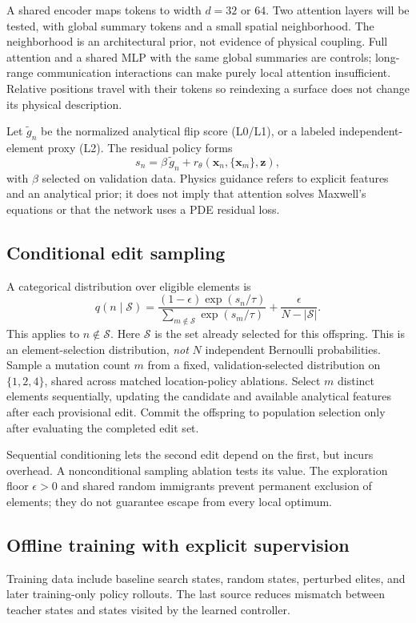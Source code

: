 \documentclass[conference]{IEEEtran}
\begin{document}
A shared encoder maps tokens to width $d=32$ or $64$. Two attention layers will be tested, with global summary tokens and a small spatial neighborhood. The neighborhood is an architectural prior, not evidence of physical coupling. Full attention and a shared MLP with the same global summaries are controls; long-range communication interactions can make purely local attention insufficient. Relative positions travel with their tokens so reindexing a surface does not change its physical description.

Let $\widetilde g_n$ be the normalized analytical flip score (L0/L1), or a labeled independent-element proxy (L2). The residual policy forms
\[
s_n=\beta\,\widetilde g_n+r_\theta(\mathbf x_n,\{\mathbf x_m\},\mathbf z),
\]
with $\beta$ selected on validation data. Physics guidance refers to explicit features and an analytical prior; it does not imply that attention solves Maxwell's equations or that the network uses a PDE residual loss.

\subsection{Conditional edit sampling}
A categorical distribution over eligible elements is
\[
q(n\mid\mathcal S)=
\frac{(1-\epsilon)\exp(s_n/\tau)}
{\sum_{m\notin\mathcal S}\exp(s_m/\tau)}
+\frac{\epsilon}{N-|\mathcal S|}.
\]
This applies to $n\notin\mathcal S$.
Here $\mathcal S$ is the set already selected for this offspring. This is an element-selection distribution, \emph{not} $N$ independent Bernoulli probabilities. Sample a mutation count $m$ from a fixed, validation-selected distribution on $\{1,2,4\}$, shared across matched location-policy ablations. Select $m$ distinct elements sequentially, updating the candidate and available analytical features after each provisional edit. Commit the offspring to population selection only after evaluating the completed edit set.

Sequential conditioning lets the second edit depend on the first, but incurs overhead. A nonconditional sampling ablation tests its value. The exploration floor $\epsilon>0$ and shared random immigrants prevent permanent exclusion of elements; they do not guarantee escape from every local optimum.

\subsection{Offline training with explicit supervision}
Training data include baseline search states, random states, perturbed elites, and later training-only policy rollouts. The last source reduces mismatch between teacher states and states visited by the learned controller.
\end{document}
